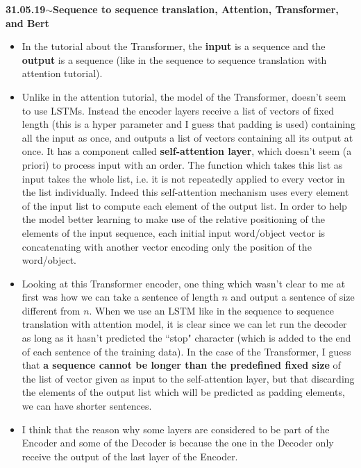 \documentclass[11pt,a4paper]{article}
\newenvironment{loggentry}[2]%
{\noindent\textbf{#1}\hspace{1cm}$\mathbf{\sim}$\text{ }\textbf{#2}\\}{\vspace{0.5cm}}
\begin{document}
\begin{loggentry}{31.05.19}{Sequence to sequence translation, Attention, Transformer, and Bert}
\begin{itemize}
\item In the tutorial about the Transformer, the \textbf{input} is a sequence and the \textbf{output} is a sequence (like in the sequence to sequence translation with attention tutorial).
\item Unlike in the attention tutorial, the model of the Transformer, doesn't seem to use LSTMs. Instead the encoder layers receive a list of vectors of fixed length (this is a hyper parameter and I guess that padding is used) containing all the input as once, and outputs a list of vectors containing all its output at once. It has a component called \textbf{self-attention layer}, which doesn't seem (a priori) to process input with an order. The function which takes this list as input takes the whole list, i.e. it is not repeatedly applied to every vector in the list individually. Indeed this self-attention mechanism uses every element of the input list to compute each element of the output list. In order to help the model better learning to make use of the relative positioning of the elements of the input sequence, each initial input word/object vector is concatenating with another vector encoding only the position of the word/object.
\item Looking at this Transformer encoder, one thing which wasn't clear to me at first was how we can take a sentence of length $n$ and output a sentence of size different from $n$. When we use an LSTM like in the sequence to sequence translation with attention model, it is clear since we can let run the decoder as long as it hasn't predicted the ``stop" character (which is added to the end of each sentence of the training data). In the case of the Transformer, I guess that \textbf{a sequence cannot be longer than the predefined fixed size} of the list of vector given as input to the self-attention layer, but that discarding the elements of the output list which will be predicted as padding elements, we can have shorter sentences.
\item I think that the reason why some layers are considered to be part of the Encoder and some of the Decoder is because the one in the Decoder only receive the output of the last layer of the Encoder.

\end{itemize}
\end{loggentry}
\end{document}
